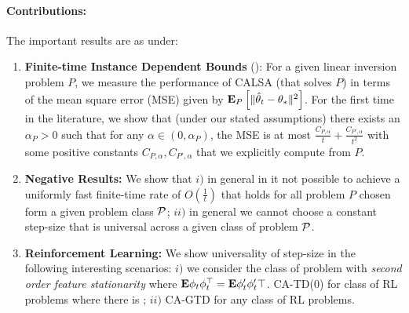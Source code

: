 \paragraph{Contributions:} The important results are as under:
\begin{enumerate}[leftmargin=*]%
\item \textbf{Finite-time Instance Dependent Bounds} (): For a given linear inversion problem $P$, we measure the performance of CALSA (that solves $P$) in terms of the mean square error (MSE) given by $\EEP{\normsm{\thh_t-\ts}^2}$.
For the first time in the literature,
we show that (under our stated assumptions) there exists an $\alpha_P>0$ such that 
for any $\alpha\in (0,\alpha_P)$,
the MSE %
is at most $\frac{C_{P,\alpha}}{t}+\frac{C_{P',\alpha}}{t^2}$ with some positive constants $C_{P,\alpha},C_{P',\alpha}$ that we explicitly compute from $P$.
\item \textbf{Negative Results:} We show that $i)$ in general in it not possible to achieve a uniformly fast finite-time rate of $O(\frac{1}{t})$ that holds for all problem $P$ chosen form a given problem class $\P$; $ii)$ in general we cannot choose a constant step-size that is universal across a given class of problem $\P$.
\item \textbf{Reinforcement Learning:} We show universality of step-size in the following interesting scenarios: $i)$ we consider the class of problem with \emph{second order feature stationarity} where $\E{\phi_t\phi_t^\top}=\E{\phi'_t\phi'_t\top}$. CA-TD(0) for class of RL problems where there is ; $ii)$ CA-GTD for any class of RL problems.
\end{enumerate}

